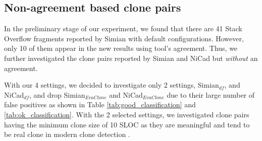 \documentclass{sig-alternate-05-2015}
\begin{document}


\subsection{Non-agreement based clone pairs}
In the preliminary stage of our experiment, we found that there are 41 Stack Overflow fragments reported by Simian with default configurations. However, only 10 of them appear in the new results using tool's agreement. Thus, we further investigated the clone pairs reported by Simian and NiCad but \textit{without} an agreement. 

With our 4 settings, we decided to investigate only 2 settings, Simian$_{df}$, and NiCad$_{df}$, and drop Simian$_{\mathrm{\textit{EvaClone}}}$ and NiCad$_{\mathrm{\textit{EvaClone}}}$ due to their large number of false positives as shown in Table \ref{tab:good_classification} and \ref{tab:ok_classification}. With the 2 selected settings, we investigated clone pairs having the minimum clone size of 10 SLOC as they are meaningful and tend to be real clone in modern clone detection \cite{Sajnani2016}. 
\end{document}
